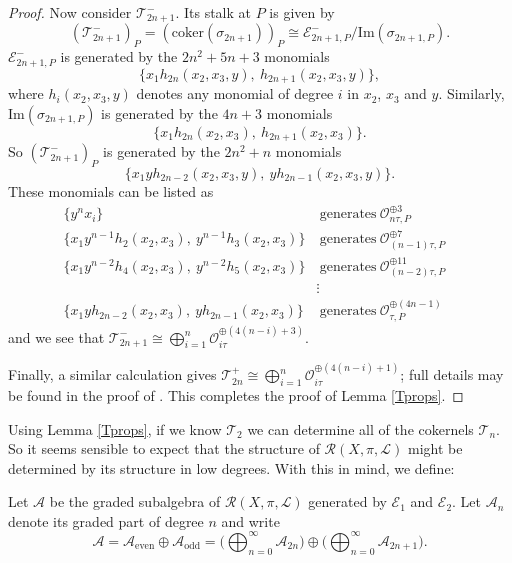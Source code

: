 \documentclass{amsart}
\begin{document}
\begin{proof}
Now consider ${\mathcal{T}}^-_{2n+1}$. Its stalk at $P$ is given by
\[ ({\mathcal{T}}^-_{2n+1})_P = (\mathrm{coker}(\sigma_{2n+1}))_P \cong {\mathcal{E}}^-_{2n+1,P}/\mathrm{Im}(\sigma_{2n+1,P}).\]
${\mathcal{E}}^-_{2n+1,P}$ is generated by the $2n^2 + 5n + 3$ monomials 
\[\{x_1h_{2n}(x_2,x_3,y),\ h_{2n+1}(x_2,x_3,y)\},\] where $h_i(x_2,x_3,y)$ denotes any monomial of degree $i$ in $x_2$, $x_3$ and $y$. Similarly, $\mathrm{Im}(\sigma_{2n+1,P})$ is generated by the $4n+3$ monomials 
\[\{x_1h_{2n}(x_2,x_3),\ h_{2n+1}(x_2,x_3)\}.\]
So $({\mathcal{T}}^-_{2n+1})_P$ is generated by the $2n^2 + n$ monomials
\[ \{x_1yh_{2n-2}(x_2,x_3,y),\ yh_{2n-1}(x_2,x_3,y)\}.\]
These monomials can be listed as
\begin{align*} \{y^n x_i\} & \ \mathrm{generates} \ {\mathcal{O}}_{n\tau,P}^{\oplus 3} \\
\{x_1y^{n-1}h_2(x_2,x_3),\ y^{n-1}h_3(x_2,x_3)\} &\ \mathrm{generates} \ {\mathcal{O}}_{(n-1)\tau,P}^{\oplus 7} \\
\{x_1y^{n-2}h_4(x_2,x_3),\ y^{n-2}h_5(x_2,x_3)\} &\ \mathrm{generates} \ {\mathcal{O}}_{(n-2)\tau,P}^{\oplus 11} \\
& \vdots & \\
\{x_1yh_{2n-2}(x_2,x_3),\ yh_{2n-1}(x_2,x_3)\} &\ \mathrm{generates} \ {\mathcal{O}}_{\tau,P}^{\oplus (4n - 1)}
\end{align*}
and we see that ${\mathcal{T}}_{2n+1}^-  \cong \bigoplus_{i=1}^n {\mathcal{O}}_{i\tau}^{\oplus(4(n-i)+3)}$.

Finally, a similar calculation gives ${\mathcal{T}}_{2n}^+  \cong \bigoplus_{i=1}^n {\mathcal{O}}_{i\tau}^{\oplus(4(n-i)+1)}$; full details may be found in the proof of \cite[Lemma 4.2.1]{mythesis}. This completes the proof of Lemma \ref{Tprops}.\end{proof}

Using Lemma \ref{Tprops}, if we know ${\mathcal{T}}_2$ we can determine all of the cokernels ${\mathcal{T}}_n$. So it seems sensible to expect that the structure of ${\mathcal{R}}(X,\pi,{\mathcal{L}})$ might be determined by its structure in low degrees. With this in mind, we define:

\begin{defn} Let ${\mathcal{A}}$ be the graded subalgebra of ${\mathcal{R}}(X,\pi,{\mathcal{L}})$ generated by ${\mathcal{E}}_1$ and ${\mathcal{E}}_2$. Let ${\mathcal{A}}_n$ denote its graded part of degree $n$ and write
\[ {\mathcal{A}} = {\mathcal{A}}_{\mathrm{even}} \oplus {\mathcal{A}}_{\mathrm{odd}} = \Big(\bigoplus_{n=0}^{\infty} {\mathcal{A}}_{2n}\Big) \oplus \Big(\bigoplus_{n=0}^{\infty} {\mathcal{A}}_{2n+1}\Big).\]
\end{defn}
\end{document}
